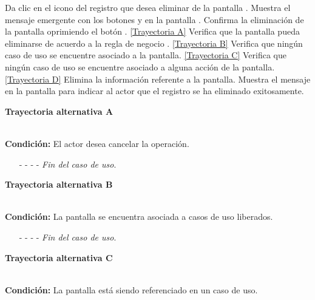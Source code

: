 	\begin{UCtrayectoria}
		\UCpaso[\UCactor] Da clic en el icono \eliminar del registro que desea eliminar de la pantalla .
		\UCpaso[\UCsist] Muestra el mensaje emergente  con los botones  y  en la pantalla .
		\UCpaso[\UCactor] Confirma la eliminación de la pantalla oprimiendo el botón . \hyperlink{CU11-3:TAA}{[Trayectoria A]}
		\UCpaso[\UCsist] Verifica que la pantalla pueda eliminarse de acuerdo a la regla de negocio . \hyperlink{CU11-3:TAB}{[Trayectoria B]}
		\UCpaso[\UCsist] Verifica que ningún caso de uso se encuentre asociado a la pantalla. \hyperlink{CU11-3:TAC}{[Trayectoria C]}
		\UCpaso[\UCsist] Verifica que ningún caso de uso se encuentre asociado a alguna acción de la pantalla. \hyperlink{CU11-3:TAD}{[Trayectoria D]}
		\UCpaso[\UCsist] Elimina la información referente a la pantalla.
		\UCpaso[\UCsist] Muestra el mensaje  en la pantalla  para indicar al actor que el registro se ha eliminado exitosamente.
	\end{UCtrayectoria}		
\hypertarget{CU11-3:TAA}{\textbf{Trayectoria alternativa A}}\\
\noindent \textbf{Condición:} El actor desea cancelar la operación.
\begin{enumerate}
	\UCpaso[\UCactor] Oprime el botón  de la pantalla emergente.
	\UCpaso[\UCsist] Muestra la pantalla .
	\item[- -] - - {\em {Fin del caso de uso}}.%
\end{enumerate}		
\hypertarget{CU11-3:TAB}{\textbf{Trayectoria alternativa B}}\\
\noindent \textbf{Condición:} La pantalla se encuentra asociada a casos de uso liberados.
\begin{enumerate}
	\UCpaso[\UCsist] Oculta el botón \eliminar de la pantalla que esta asociada a casos de uso liberados.
	\item[- -] - - {\em {Fin del caso de uso}}.
\end{enumerate}
\hypertarget{CU11-3:TAC}{\textbf{Trayectoria alternativa C}}\\
\noindent \textbf{Condición:} La pantalla está siendo referenciado en un caso de uso.
